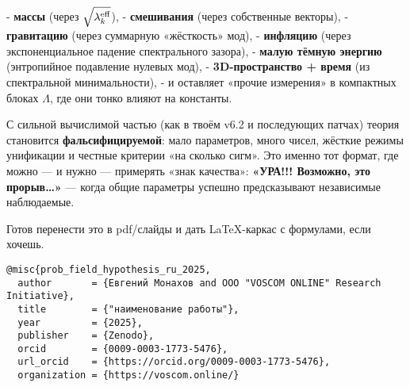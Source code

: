 \documentclass[12pt,a4paper]{article}
\begin{document}
- \textbf{массы} (через \(\sqrt{\lambda_k^{\rm eff}}\)),  
- \textbf{смешивания} (через собственные векторы),  
- \textbf{гравитацию} (через суммарную «жёсткость» мод),  
- \textbf{инфляцию} (через экспоненциальное падение спектрального зазора),  
- \textbf{малую тёмную энергию} (энтропийное подавление нулевых мод),  
- \textbf{3D-пространство + время} (из спектральной минимальности),  
- и оставляет «прочие измерения» в компактных блоках \(\Lambda\), где они тонко влияют на константы.

С сильной вычислимой частью (как в твоём v6.2 и последующих патчах) теория становится \textbf{фальсифицируемой}: мало параметров, много чисел, жёсткие режимы унификации и честные критерии «на сколько сигм». Это именно тот формат, где можно — и нужно — примерять «знак качества»:  
\textbf{«УРА!!! Возможно, это прорыв…»} — когда общие параметры успешно предсказывают независимые наблюдаемые.

Готов перенести это в pdf/слайды и дать LaTeX-каркас с формулами, если хочешь.

\begin{verbatim}
@misc{prob_field_hypothesis_ru_2025,
  author       = {Евгений Монахов and ООО "VOSCOM ONLINE" Research Initiative},
  title        = {"наименование работы"}, 
  year         = {2025},
  publisher    = {Zenodo},
  orcid        = {0009-0003-1773-5476},
  url_orcid    = {https://orcid.org/0009-0003-1773-5476},
  organization = {https://voscom.online/}
\end{verbatim}
\end{document}
